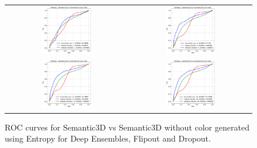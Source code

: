     \begin{figure}
        \centering
        \begin{tabular}{cc}
            \includegraphics[width = 0.42\textwidth, height= 0.3\textheight]{images/AUROC/Entropy_cnc_1.pdf} & 
            \includegraphics[width = 0.42\textwidth, height= 0.3\textheight]{images/AUROC/Entropy_cnc_5.pdf}\\ 
            \includegraphics[width = 0.42\textwidth, height= 0.3\textheight]{images/AUROC/Entropy_cnc_15.pdf} &
            \includegraphics[width = 0.42\textwidth, height= 0.3\textheight]{images/AUROC/Entropy_cnc_20.pdf} 
            \\
        \end{tabular}
        \caption{ROC curves for Semantic3D vs Semantic3D without color generated using Entropy for Deep Ensembles, Flipout and Dropout.}
        \label{fig:roc_ent_ood_2}
    \end{figure}    


